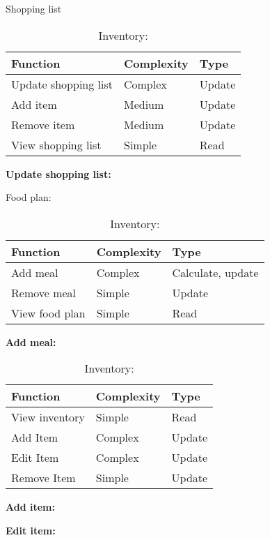 \begin{table}[H]
	\centering
	\caption{Shopping list}
	\begin{tabular}{|l|l|l|}\hline
		\textbf{Function}&\textbf{Complexity}&\textbf{Type}\\\hline
	  Update shopping list  &  Complex & Update \\\hline
	  Add item              &  Medium  & Update \\\hline
	  Remove item           &  Medium  & Update \\\hline
	  View shopping list    &  Simple  & Read   \\\hline
  \end{tabular}
  \begin{flushleft}
    \textbf{Update shopping list:}
  \end{flushleft}
	\caption{Food plan:}
  \begin{tabular}{|l|l|l|}\hline
		\textbf{Function}&\textbf{Complexity}&\textbf{Type}\\\hline
	  Add meal              &  Complex & Calculate, update \\\hline
	  Remove meal           &  Simple  & Update            \\\hline
	  View food plan        &  Simple  & Read              \\\hline
  \end{tabular}
  \begin{flushleft}
    \textbf{Add meal:}
  \end{flushleft}
	\caption{Inventory:}
  \begin{tabular}{|l|l|l|}\hline
		\textbf{Function}&\textbf{Complexity}&\textbf{Type}\\\hline
	  View inventory        &  Simple  & Read   \\\hline
	  Add Item              &  Complex & Update \\\hline
	  Edit Item             &  Complex & Update \\\hline
	  Remove Item           &  Simple  & Update \\\hline
  \end{tabular}
  \begin{flushleft}  	  
    \textbf{Add item:}
    
    \textbf{Edit item:}
  \end{flushleft}
\end{table}
